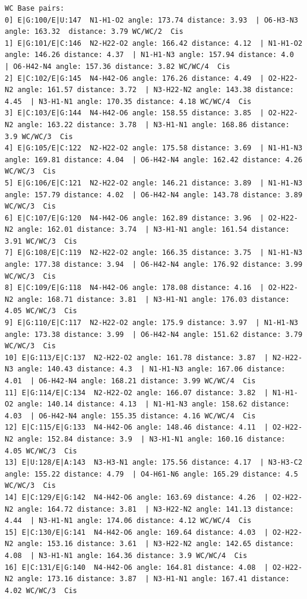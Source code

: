 \documentclass[12pt]{article}
\begin{document}
\begin{appendices}
\begin{scriptsize}
\begin{lstlisting}
WC Base pairs: 
0] E|G:100/E|U:147  N1-H1-O2 angle: 173.74 distance: 3.93  | O6-H3-N3 angle: 163.32  distance: 3.79 WC/WC/2  Cis
1] E|G:101/E|C:146  N2-H22-O2 angle: 166.42 distance: 4.12  | N1-H1-O2 angle: 146.26 distance: 4.37  | N1-H1-N3 angle: 157.94 distance: 4.0  | O6-H42-N4 angle: 157.36 distance: 3.82 WC/WC/4  Cis
2] E|C:102/E|G:145  N4-H42-O6 angle: 176.26 distance: 4.49  | O2-H22-N2 angle: 161.57 distance: 3.72  | N3-H22-N2 angle: 143.38 distance: 4.45  | N3-H1-N1 angle: 170.35 distance: 4.18 WC/WC/4  Cis
3] E|C:103/E|G:144  N4-H42-O6 angle: 158.55 distance: 3.85  | O2-H22-N2 angle: 163.22 distance: 3.78  | N3-H1-N1 angle: 168.86 distance: 3.9 WC/WC/3  Cis
4] E|G:105/E|C:122  N2-H22-O2 angle: 175.58 distance: 3.69  | N1-H1-N3 angle: 169.81 distance: 4.04  | O6-H42-N4 angle: 162.42 distance: 4.26 WC/WC/3  Cis
5] E|G:106/E|C:121  N2-H22-O2 angle: 146.21 distance: 3.89  | N1-H1-N3 angle: 157.79 distance: 4.02  | O6-H42-N4 angle: 143.78 distance: 3.89 WC/WC/3  Cis
6] E|C:107/E|G:120  N4-H42-O6 angle: 162.89 distance: 3.96  | O2-H22-N2 angle: 162.01 distance: 3.74  | N3-H1-N1 angle: 161.54 distance: 3.91 WC/WC/3  Cis
7] E|G:108/E|C:119  N2-H22-O2 angle: 166.35 distance: 3.75  | N1-H1-N3 angle: 177.38 distance: 3.94  | O6-H42-N4 angle: 176.92 distance: 3.99 WC/WC/3  Cis
8] E|C:109/E|G:118  N4-H42-O6 angle: 178.08 distance: 4.16  | O2-H22-N2 angle: 168.71 distance: 3.81  | N3-H1-N1 angle: 176.03 distance: 4.05 WC/WC/3  Cis
9] E|G:110/E|C:117  N2-H22-O2 angle: 175.9 distance: 3.97  | N1-H1-N3 angle: 173.38 distance: 3.99  | O6-H42-N4 angle: 151.62 distance: 3.79 WC/WC/3  Cis
10] E|G:113/E|C:137  N2-H22-O2 angle: 161.78 distance: 3.87  | N2-H22-N3 angle: 140.43 distance: 4.3  | N1-H1-N3 angle: 167.06 distance: 4.01  | O6-H42-N4 angle: 168.21 distance: 3.99 WC/WC/4  Cis
11] E|G:114/E|C:134  N2-H22-O2 angle: 166.07 distance: 3.82  | N1-H1-O2 angle: 140.14 distance: 4.13  | N1-H1-N3 angle: 158.62 distance: 4.03  | O6-H42-N4 angle: 155.35 distance: 4.16 WC/WC/4  Cis
12] E|C:115/E|G:133  N4-H42-O6 angle: 148.46 distance: 4.11  | O2-H22-N2 angle: 152.84 distance: 3.9  | N3-H1-N1 angle: 160.16 distance: 4.05 WC/WC/3  Cis
13] E|U:128/E|A:143  N3-H3-N1 angle: 175.56 distance: 4.17  | N3-H3-C2 angle: 155.22 distance: 4.79  | O4-H61-N6 angle: 165.29 distance: 4.5 WC/WC/3  Cis
14] E|C:129/E|G:142  N4-H42-O6 angle: 163.69 distance: 4.26  | O2-H22-N2 angle: 164.72 distance: 3.81  | N3-H22-N2 angle: 141.13 distance: 4.44  | N3-H1-N1 angle: 174.06 distance: 4.12 WC/WC/4  Cis
15] E|C:130/E|G:141  N4-H42-O6 angle: 169.64 distance: 4.03  | O2-H22-N2 angle: 153.16 distance: 3.61  | N3-H22-N2 angle: 142.65 distance: 4.08  | N3-H1-N1 angle: 164.36 distance: 3.9 WC/WC/4  Cis
16] E|C:131/E|G:140  N4-H42-O6 angle: 164.81 distance: 4.08  | O2-H22-N2 angle: 173.16 distance: 3.87  | N3-H1-N1 angle: 167.41 distance: 4.02 WC/WC/3  Cis


\end{lstlisting}
\end{scriptsize}
\end{appendices}
\end{document}
